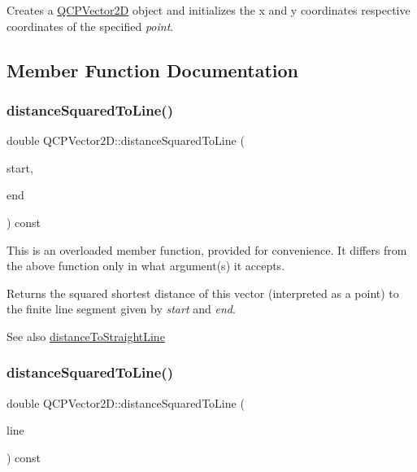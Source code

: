 Creates a \mbox{\hyperlink{class_q_c_p_vector2_d}{Q\+C\+P\+Vector2D}} object and initializes the x and y coordinates respective coordinates of the specified {\itshape point}. 

\subsection{Member Function Documentation}
\mbox{\label{class_q_c_p_vector2_d_a14840cd3da80cfee4eb3f8977cab89ab}} 
\subsubsection{\texorpdfstring{distance\+Squared\+To\+Line()}{distanceSquaredToLine()}\hspace{0.1cm}{\footnotesize\ttfamily [1/2]}}
{\footnotesize\ttfamily double Q\+C\+P\+Vector2\+D\+::distance\+Squared\+To\+Line (\begin{DoxyParamCaption}\item[{const \mbox{\hyperlink{class_q_c_p_vector2_d}{Q\+C\+P\+Vector2D}} \&}]{start,  }\item[{const \mbox{\hyperlink{class_q_c_p_vector2_d}{Q\+C\+P\+Vector2D}} \&}]{end }\end{DoxyParamCaption}) const}

This is an overloaded member function, provided for convenience. It differs from the above function only in what argument(s) it accepts.

Returns the squared shortest distance of this vector (interpreted as a point) to the finite line segment given by {\itshape start} and {\itshape end}.

\begin{DoxySeeAlso}{See also}
\mbox{\hyperlink{class_q_c_p_vector2_d_ae240b845c3744e43a5d0aa7b2bb66c19}{distance\+To\+Straight\+Line}} 
\end{DoxySeeAlso}
\mbox{\label{class_q_c_p_vector2_d_a0c44ca97d46ee04feec32c1c57e70831}} 
\subsubsection{\texorpdfstring{distance\+Squared\+To\+Line()}{distanceSquaredToLine()}\hspace{0.1cm}{\footnotesize\ttfamily [2/2]}}
{\footnotesize\ttfamily double Q\+C\+P\+Vector2\+D\+::distance\+Squared\+To\+Line (\begin{DoxyParamCaption}\item[{const Q\+LineF \&}]{line }\end{DoxyParamCaption}) const}

